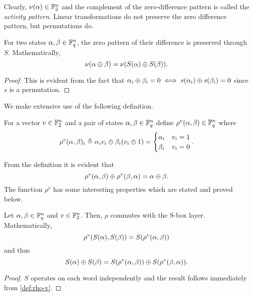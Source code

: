 \documentclass[twoside]{article}
\begin{document}
Clearly, \(\nu(\alpha) \in \mathbb F_2^n\) and the complement of the
zero-difference pattern is called the \emph{activity pattern}. Linear
transformations do not preserve the zero difference pattern, but permutations
do.

\begin{lemma}
    \label{lem:zero-diff-perm}
    For two states \(\alpha, \beta \in \mathbb F_q^n\), the zero pattern of their
    difference is preserved through \(S\). Mathematically,
    \begin{equation}
        \nu(\alpha \oplus \beta) = \nu(S(\alpha) \oplus S(\beta)).
        \label{eq:zero-diff-perm}
    \end{equation}
\end{lemma}
\begin{proof}
    This is evident from the fact that \(\alpha_i \oplus \beta_i = 0 \iff
    s(\alpha_i) \oplus s(\beta_i) = 0\) since \(s\) is a permutation.
\end{proof}

We make extensive use of the following definition.

\begin{definition}
    \label{def:rho-v}
    For a vector \(v \in \mathbb F_2^n\) and a pair of states \(\alpha, \beta \in
    \mathbb F_q^n\) define \(\rho^v(\alpha, \beta) \in \mathbb F_q^n\) where
    \begin{equation}
        \rho^v(\alpha, \beta)_i \triangleq \alpha_iv_i \oplus \beta_i(v_i \oplus 1) =
        \begin{cases}
            \alpha_i & v_i = 1 \\
            \beta_i & v_i = 0
        \end{cases}.
        \label{eq:rho-v-def}
    \end{equation}
\end{definition}

From the definition it is evident that
\begin{equation}
    \rho^v(\alpha, \beta) \oplus \rho^v(\beta, \alpha) = \alpha \oplus \beta.
    \label{eq:rho-xor}
\end{equation}
The function \(\rho^v\) has some interesting properties which are stated and
proved below.

\begin{lemma}
    \label{lem:rho-perm}
    Let \(\alpha, \beta \in \mathbb F_q^n\) and \(v \in \mathbb F_2^n\). Then, \(\rho\)
    commutes with the S-box layer. Mathematically,
    \begin{equation}
        \rho^v(S(\alpha), S(\beta)) = S(\rho^v(\alpha, \beta))
        \label{eq:rho-s-invariant}
    \end{equation}
    and thus
    \begin{equation}
        S(\alpha) \oplus S(\beta) = S(\rho^v(\alpha, \beta)) \oplus S(\rho^v(\beta, \alpha)).
    \end{equation}
\end{lemma}
\begin{proof}
    \(S\) operates on each word independently and the result follows immediately
    from \autoref{def:rho-v}.
\end{proof}
\end{document}
